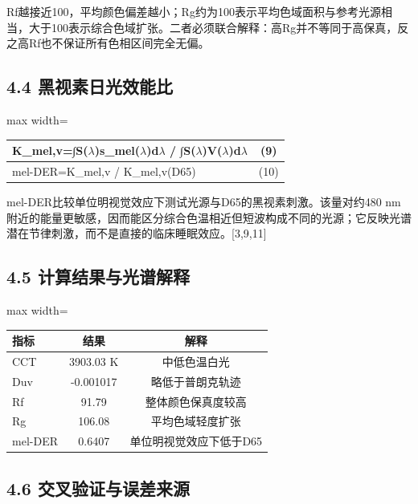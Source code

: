 \documentclass[UTF8,a4paper,12pt]{ctexart}
\begin{document}
Rf越接近100，平均颜色偏差越小；Rg约为100表示平均色域面积与参考光源相当，大于100表示综合色域扩张。二者必须联合解释：高Rg并不等同于高保真，反之高Rf也不保证所有色相区间完全无偏。

\subsection{4.4 黑视素日光效能比}

\begin{table}[H]
\centering
\small
\begin{adjustbox}{max width=\textwidth}
\begin{tabular}{lc}
\toprule
K\_mel,v=∫S($\lambda$)s\_mel($\lambda$)d$\lambda$ / ∫S($\lambda$)V($\lambda$)d$\lambda$ & (9) \\
\midrule
mel-DER=K\_mel,v / K\_mel,v(D65) & (10) \\
\bottomrule
\end{tabular}
\end{adjustbox}
\end{table}

mel-DER比较单位明视觉效应下测试光源与D65的黑视素刺激。该量对约480 nm附近的能量更敏感，因而能区分综合色温相近但短波构成不同的光源；它反映光谱潜在节律刺激，而不是直接的临床睡眠效应。[3,9,11]

\subsection{4.5 计算结果与光谱解释}

\begin{table}[H]
\centering
\small
\begin{adjustbox}{max width=\textwidth}
\begin{tabular}{lcc}
\toprule
指标 & 结果 & 解释 \\
\midrule
CCT & 3903.03 K & 中低色温白光 \\
Duv & -0.001017 & 略低于普朗克轨迹 \\
Rf & 91.79 & 整体颜色保真度较高 \\
Rg & 106.08 & 平均色域轻度扩张 \\
mel-DER & 0.6407 & 单位明视觉效应下低于D65 \\
\bottomrule
\end{tabular}
\end{adjustbox}
\end{table}

\subsection{4.6 交叉验证与误差来源}
\end{document}
